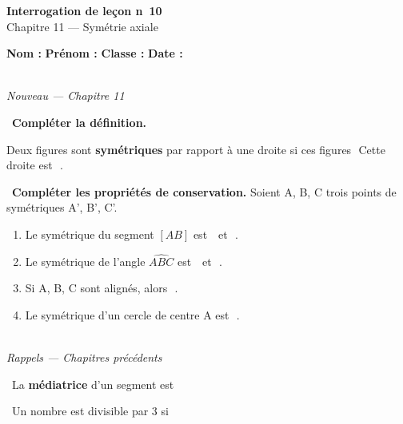 \documentclass[a4paper,11pt]{article}
\newcommand{\bl}[1][4cm]{\,\makebox[#1]{\dotfill}\,}
\newcommand{\coeur}{\textcolor{Couleur8}{\faHeart}\ }
\newcommand{\coeurrappel}{\textcolor{Couleur6}{\faHeart}\ }
\begin{document}
\begin{mdframed}[linecolor=Couleur1,linewidth=2pt,topline=true,bottomline=true,leftline=false,rightline=false,innertopmargin=8pt,innerbottommargin=8pt,backgroundcolor=Couleur1!5]
\begin{center}
{\Large\bfseries\textcolor{Couleur1}{Interrogation de le\c{c}on n\degre~10}}\\[4pt]
{\large\textcolor{Couleur8}{Chapitre 11 --- Sym\'etrie axiale}}
\end{center}
\end{mdframed}
\vspace{0.4cm}
\noindent\textbf{Nom :} \dotfill\quad\textbf{Pr\'enom :} \dotfill\quad\textbf{Classe :} \dotfill\quad\textbf{Date :} \dotfill
\vspace{0.5cm}

\vspace{0.3cm}
\noindent{\textcolor{Couleur8}{\rule{\textwidth}{0.5pt}}}\\
{\small\textit{\textcolor{Couleur8}{Nouveau --- Chapitre 11}}}
\vspace{0.1cm}

\noindent \coeur \textbf{Compl\'eter la d\'efinition.}
\begin{mdframed}[linecolor=Couleur6,linewidth=4pt,topline=false,bottomline=false,rightline=false,backgroundcolor=Couleur6!10,innerleftmargin=8pt,innertopmargin=6pt,innerbottommargin=6pt]
Deux figures sont \textbf{sym\'etriques} par rapport \`a une droite si ces figures \bl[7cm]\dotfill Cette droite est \bl[4cm].
\end{mdframed}

\noindent \coeur \textbf{Compl\'eter les propri\'et\'es de conservation.} Soient A, B, C trois points de sym\'etriques A', B', C'.
\begin{mdframed}[linecolor=Couleur1,linewidth=4pt,topline=false,bottomline=false,rightline=false,backgroundcolor=Couleur1!5,innerleftmargin=8pt,innertopmargin=6pt,innerbottommargin=6pt]
\begin{enumerate}[nosep,itemsep=4pt]
\item Le sym\'etrique du segment $[AB]$ est \bl[3cm] et \bl[3cm].
\item Le sym\'etrique de l'angle $\widehat{ABC}$ est \bl[3cm] et \bl[3cm].
\item Si A, B, C sont align\'es, alors \bl[6cm].
\item Le sym\'etrique d'un cercle de centre A est \bl[6cm].
\end{enumerate}
\end{mdframed}

\vspace{0.3cm}
\noindent{\textcolor{Couleur8}{\rule{\textwidth}{0.5pt}}}\\
{\small\textit{\textcolor{Couleur8}{Rappels --- Chapitres pr\'ec\'edents}}}
\vspace{0.1cm}

\noindent \coeurrappel La \textbf{m\'ediatrice} d'un segment est \dotfill

\noindent \coeurrappel Un nombre est divisible par $3$ si \dotfill
\end{document}
